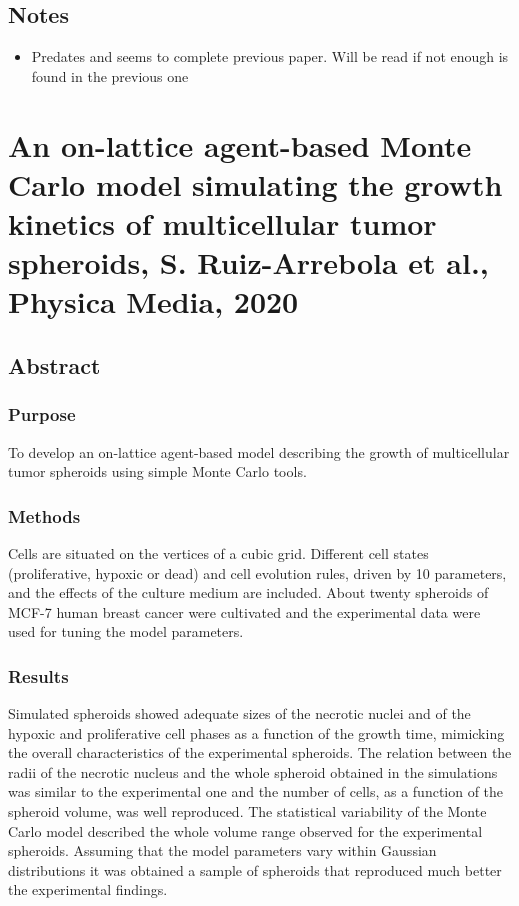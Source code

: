 \documentclass[11pt,a4paper]{article}
\begin{document}
\subsection*{Notes}
\begin{itemize}
\item Predates and seems to complete previous paper. Will be read if not enough is found in the previous one
\end{itemize}

\section*{An on-lattice agent-based Monte Carlo model simulating the growth kinetics of multicellular tumor spheroids, S. Ruiz-Arrebola et al., Physica Media, 2020}
\subsection*{Abstract}
\subsubsection*{Purpose}
To develop an on-lattice agent-based model describing the growth of multicellular tumor spheroids using simple Monte Carlo tools.

\subsubsection*{Methods}
Cells are situated on the vertices of a cubic grid. Different cell states (proliferative, hypoxic or dead) and cell evolution rules, driven by 10 parameters, and the effects of the culture medium are included. About twenty spheroids of MCF-7 human breast cancer were cultivated and the experimental data were used for tuning the model parameters.

\subsubsection*{Results}
Simulated spheroids showed adequate sizes of the necrotic nuclei and of the hypoxic and proliferative cell phases as a function of the growth time, mimicking the overall characteristics of the experimental spheroids. The relation between the radii of the necrotic nucleus and the whole spheroid obtained in the simulations was similar to the experimental one and the number of cells, as a function of the spheroid volume, was well reproduced. The statistical variability of the Monte Carlo model described the whole volume range observed for the experimental spheroids. Assuming that the model parameters vary within Gaussian distributions it was obtained a sample of spheroids that reproduced much better the experimental findings.
\end{document}
